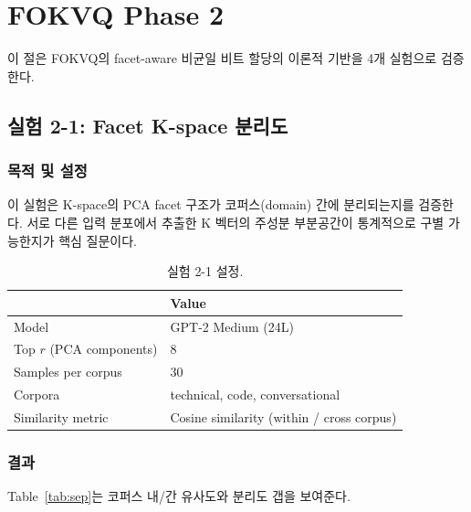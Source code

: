 \documentclass[11pt,a4paper]{article}
\begin{document}
\newpage
\section{FOKVQ Phase 2}

이 절은 FOKVQ의 facet-aware 비균일 비트 할당의 이론적 기반을 4개 실험으로 검증한다.

\subsection{실험 2-1: Facet K-space 분리도}

\subsubsection{목적 및 설정}

이 실험은 K-space의 PCA facet 구조가 코퍼스(domain) 간에 분리되는지를 검증한다.
서로 다른 입력 분포에서 추출한 K 벡터의 주성분 부분공간이 통계적으로 구별 가능한지가 핵심 질문이다.

\begin{table}[H]
\centering
\caption{실험 2-1 설정.}
\label{tab:exp21_setup}
\begin{tabular}{ll}
\toprule
\textbf{} & \textbf{Value} \\
\midrule
Model & GPT-2 Medium (24L) \\
Top $r$ (PCA components) & 8 \\
Samples per corpus & 30 \\
Corpora & technical, code, conversational \\
Similarity metric & Cosine similarity (within / cross corpus) \\
\bottomrule
\end{tabular}
\end{table}

\subsubsection{결과}

Table~\ref{tab:sep}는 코퍼스 내/간 유사도와 분리도 갭을 보여준다.
\end{document}
